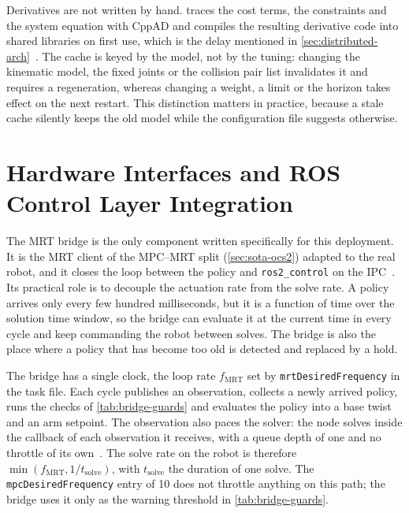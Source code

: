 Derivatives are not written by hand. \ocs{} traces the cost terms, the
constraints and the system equation with CppAD and compiles the
resulting derivative code into shared libraries on first use, which is
the delay mentioned in
\cref{sec:distributed-arch}~\cite{CppAD,ocs2Toolbox}. The cache is keyed
by the model, not by the tuning: changing the kinematic model, the fixed
joints or the collision pair list invalidates it and requires a
regeneration, whereas changing a weight, a limit or the horizon takes
effect on the next restart. This distinction matters in practice,
because a stale cache silently keeps the old model while the
configuration file suggests otherwise.

\section{Hardware Interfaces and ROS Control Layer Integration}
\label{sec:hw-interfaces}

The MRT bridge is the only component written specifically for this
deployment. It is the MRT client of the MPC--MRT split
(\cref{sec:sota-ocs2}) adapted to the real robot, and it closes the loop
between the \ocs{} policy and \texttt{ros2\_control} on the
IPC~\cite{ros2control}. Its practical role is to decouple the actuation
rate from the solve rate. A policy arrives only every few hundred
milliseconds, but it is a function of time over the solution time
window, so the bridge can evaluate it at the current time in every cycle
and keep commanding the robot between solves. The bridge is also the
place where a policy that has become too old is detected and replaced
by a hold.

The bridge has a single clock, the loop rate $f_\mathrm{MRT}$ set by
\texttt{mrtDesiredFrequency} in the task file. Each cycle publishes an
observation, collects a newly arrived policy, runs the checks of
\cref{tab:bridge-guards} and evaluates the policy into a base twist and
an arm setpoint. The observation also paces the solver: the \mpc{} node
solves inside the callback of each observation it receives, with a queue
depth of one and no throttle of its own~\cite{ocs2Toolbox}. The solve
rate on the robot is therefore $\min(f_\mathrm{MRT}, 1/t_\mathrm{solve})$,
with $t_\mathrm{solve}$ the duration of one solve. The
\texttt{mpcDesiredFrequency} entry of \qty{10}{\hz} does not throttle
anything on this path; the bridge uses it only as the warning threshold
in \cref{tab:bridge-guards}.

